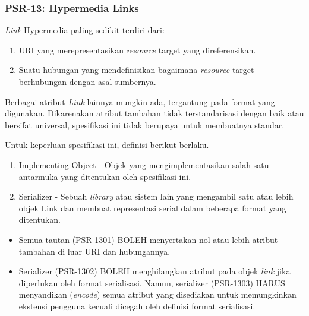 \begin{comment}
\end{itemize}

\end{comment}


\subsubsection{PSR-13: Hypermedia Links}
\label{subsubsec:psr13}
\textit{Link} Hypermedia paling sedikit terdiri dari:
\begin{enumerate}
	\item URI yang merepresentasikan \textit{resource} target yang direferensikan.
	\item Suatu hubungan yang mendefinisikan bagaimana \textit{resource} target berhubungan dengan asal sumbernya.
\end{enumerate}

Berbagai atribut \textit{Link} lainnya mungkin ada, tergantung pada format yang digunakan. Dikarenakan atribut tambahan tidak terstandarisasi dengan baik atau bersifat universal, spesifikasi ini tidak berupaya untuk membuatnya standar.

Untuk keperluan spesifikasi ini, definisi berikut berlaku.
\begin{enumerate}
	\item Implementing Object - Objek yang mengimplementasikan salah satu antarmuka yang ditentukan oleh spesifikasi ini.
	\item Serializer - Sebuah \textit{library} atau sistem lain yang mengambil satu atau lebih objek Link dan membuat representasi serial dalam beberapa format yang ditentukan.
\end{enumerate}

\begin{itemize}
	\item Semua tautan (PSR-1301) BOLEH menyertakan nol atau lebih atribut tambahan di luar URI dan hubungannya.
	\item Serializer (PSR-1302) BOLEH menghilangkan atribut pada objek \textit{link} jika diperlukan oleh format serialisasi. Namun, serializer (PSR-1303) HARUS menyandikan (\textit{encode}) semua atribut yang disediakan untuk memungkinkan ekstensi pengguna kecuali dicegah oleh definisi format serialisasi.
\end{itemize}


